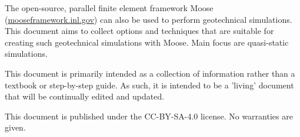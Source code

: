 The open-source, parallel finite element framework Moose
(\url{mooseframework.inl.gov}) can also be used to perform geotechnical
simulations. This document aims to collect options and techniques that are
suitable for creating such geotechnical simulations with Moose. Main focus are
quasi-static simulations.

This document is primarily intended as a collection of information rather than
a textbook or step-by-step guide. As such, it is intended to be a 'living'
document that will be continually edited and updated.

This document is published under the CC-BY-SA-4.0 license. No warranties are
given.